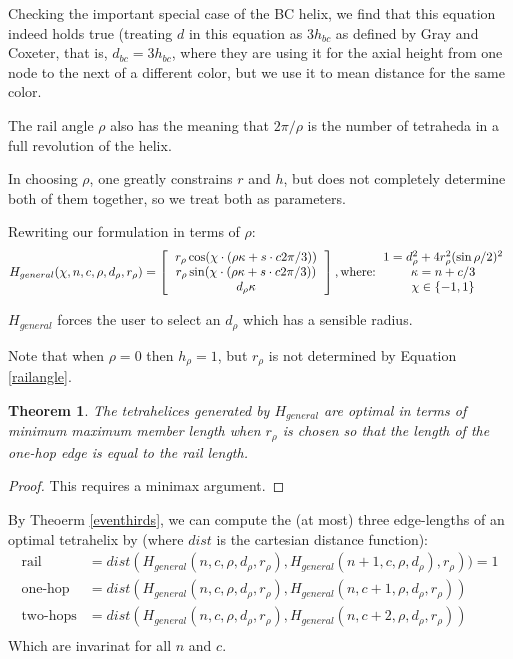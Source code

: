 \documentclass[11pt]{article}
\newtheorem{theorem}{Theorem}
\begin{document}
Checking the important special case of the BC helix, we find that this equation
indeed holds true (treating $d$ in this equation as $3 h_{bc}$ as defined by
Gray and Coxeter, that is, $d_{bc} = 3h_{bc}$, where they are using it for the axial height from one node to
the next of a different color, but we use it to mean distance for the same color.

The rail angle $\rho$ also has the meaning that $2 \pi / \rho$ is the number of
tetraheda in a full revolution of the helix.

In choosing $\rho$, one greatly constrains $r$ and $h$, but does not completely
determine both of them together, so we treat both as parameters.

Rewriting our formulation in terms of $\rho$:
\begin{equation}
H_{general}(\chi,n,c,\rho,d_{\rho},r_{\rho}) =
\left [
  \begin{tabular}{c}
   $ r_{\rho} \cos(\chi \cdot (\rho \kappa + s\cdot c 2 \pi /3)) $\\
   $ r_{\rho}  \sin(\chi \cdot (\rho \kappa + s\cdot c 2 \pi /3)) $\\
   $ d_{\rho} \kappa $
  \end{tabular}
  \right ],
\text{where:}
\begin{tabular}{c}
  $   1 = d_{\rho}^2 + 4 r_{\rho}^2 (\sin{ \rho / 2})^2 $ \\
  $\kappa = n + c/3$ \\
    $\chi \in \{-1,1\}$ \\  
  \end{tabular}      
\end{equation}


$H_{general}$ forces the user to select an $d_{\rho}$
which has a sensible radius.

Note that when $\rho = 0$ then $h_{\rho} = 1$, but $r_{\rho}$ is not determined by
Equation \ref{railangle}.

\begin{theorem}
  \label{generalformulaoptimal}
  The tetrahelices generated by $H_{general}$ are optimal in terms of minimum maximum member length when $r_{\rho}$ is chosen so that
  the length of the one-hop edge is equal to the rail length.
\end{theorem}

\begin{proof}
  This requires a minimax argument.
\end{proof}

By Theoerm \ref{eventhirds}, we can compute the (at most) three edge-lengths of an optimal
tetrahelix by (where $dist$ is the cartesian distance function):
\begin{align*}
  \text{rail} &= dist(H_{general}(n,c,\rho,d_{\rho},r_{\rho}),H_{general}(n+1,c,\rho,d_{\rho}),r_{\rho})) = 1 \\
  \text{one-hop} &= dist(H_{general}(n,c,\rho,d_{\rho},r_{\rho}),H_{general}(n,c+1,\rho,d_{\rho},r_{\rho}))  \\
  \text{two-hops} &= dist(H_{general}(n,c,\rho,d_{\rho},r_{\rho}),H_{general}(n,c+2,\rho,d_{\rho},r_{\rho}))  \\  
\end{align*}
Which are invarinat for all $n$ and $c$.
\end{document}
